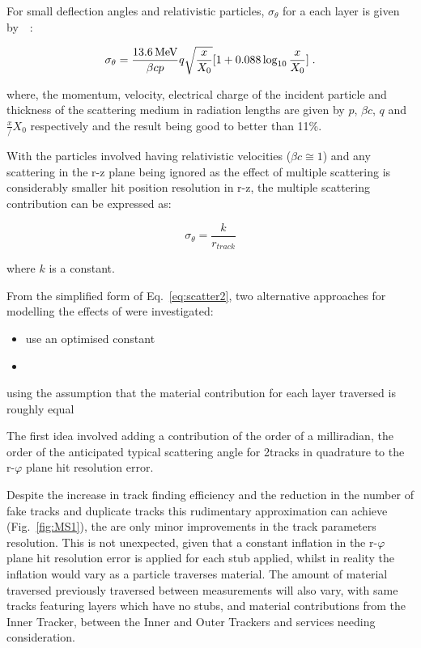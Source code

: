 {For small deflection angles and relativistic particles, $\sigma_{\theta}$ for a each layer is given by~\cite{Lynch:1990sq}~:

\begin{equation}
\sigma_{\theta} = \frac{13.6\,\text{Me\hspace{-.08em}V}}{\beta c p} q \sqrt{\frac{x}{X_{0}}} [1 + 0.088 \log_{10}{\frac{x}{X_{0}}}]  \;.
\label{eq:scatter1}
\end{equation}

where, the momentum, velocity, electrical charge of the incident particle and thickness of the scattering medium in radiation lengths are given by $p$, $\beta c$, $q$ and $\frac{x}/{X_{0}}$ respectively and the result being good to better than 11\%.

With the particles involved having relativistic velocities (\ie $\beta c \cong 1$) and any scattering in the r-z plane being ignored as the effect of multiple scattering is considerably smaller hit position resolution in r-z, the multiple scattering contribution can be expressed as:

\begin{equation}
\sigma_{\theta} = \frac{k}{r_{track}}
\label{eq:scatter2}
\end{equation}

where $k$ is a constant.

From the simplified form of Eq.~\ref{eq:scatter2}, two alternative approaches for modelling the effects of \MS were investigated:

\begin{itemize}
\item use an optimised constant 
\item 
\end{itemize}

using the assumption that the material contribution for each layer traversed is roughly equal

The first idea involved adding a contribution of the order of a milliradian, the order of the anticipated typical scattering angle for 2\GeV tracks in quadrature to the r-$\varphi$ plane hit resolution error.


Despite the increase in track finding efficiency and the reduction in the number of fake tracks and duplicate tracks this rudimentary approximation can achieve (Fig.~\ref{fig:MS1}), the are only minor improvements in the track parameters resolution.
This is not unexpected, given that a constant inflation in the r-$\varphi$ plane hit resolution error is applied for each stub applied, whilst in reality the inflation would vary as a particle traverses material.
The amount of material traversed previously traversed between measurements will also vary, with same tracks featuring layers which have no stubs, and material contributions from the Inner Tracker, between the Inner and Outer Trackers and services needing consideration.

}
